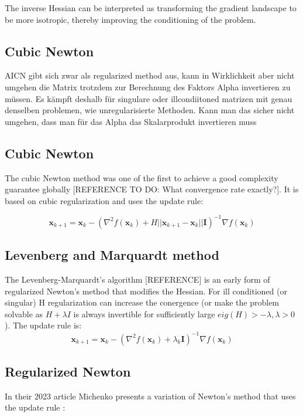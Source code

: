 \documentclass{article}
\begin{document}
The inverse Hessian can be interpreted as transforming the gradient landscape to be more isotropic, thereby improving the conditioning of the problem. 
\subsection{Cubic Newton}
AICN gibt sich zwar als regularized method aus, kann in Wirklichkeit aber nicht umgehen die Matrix trotzdem zur Berechnung des Faktors Alpha invertieren zu müssen. Es kämpft deshalb für singulare oder illcondiitoned matrizen mit genau denselben problemen, wie unregularisierte Methoden. Kann man das sicher nicht umgehen, dass man für das Alpha das Skalarprodukt invertieren muss
\subsection{Cubic Newton}

The cubic Newton method was one of the first to achieve a good complexity guarantee globally [REFERENCE TO DO: What convergence rate exactly?]. It is based on cubic regularization and uses the update rule:

\begin{equation}
\mathbf{x}_{k+1} = \mathbf{x}_{k} - ( \nabla^2 f(\mathbf{x}_k) + H ||\mathbf{x}_{k+1} - \mathbf{x}_{k}||\mathbf{I})^{-1} \nabla f(\mathbf{x}_k)
\end{equation}

\subsection{Levenberg and Marquardt method}

The Levenberg-Marquardt's algorithm [REFERENCE] is an early form of regularized Newton's method that modifies the Hessian. For ill conditioned (or singular) H regularization can increase the conergence (or make the problem solvable as $H + \lambda I$ is always invertible for sufficiently large $eig(H)> - \lambda, \lambda > 0$). The update rule is:
\begin{equation}
\mathbf{x}_{k+1} = \mathbf{x}_{k} - ( \nabla^2 f(\mathbf{x}_k) + \lambda_k \mathbf{I})^{-1} \nabla f(\mathbf{x}_k)
\end{equation}

\subsection{Regularized Newton}

In their 2023 article Michenko presents a variation of Newton's method that uses the update rule \cite{mishchenko2023regularized}:
\end{document}
